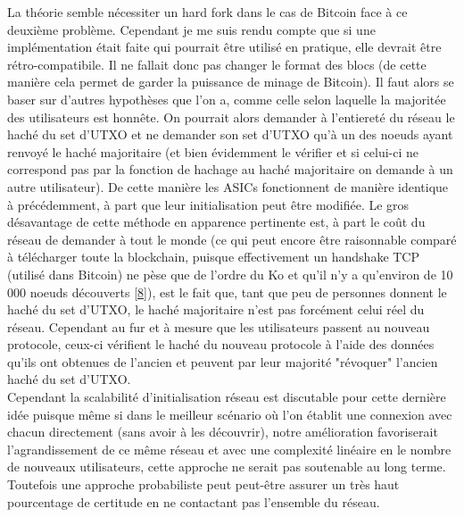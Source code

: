 \documentclass[12pt,a4paper]{article}
\newcommand{\source}[1]{\hyperlink{#1}{[#1]}}
\begin{document}
	La théorie semble nécessiter un hard fork dans le cas de Bitcoin face à ce deuxième problème. Cependant je me suis rendu compte que si une implémentation était faite qui pourrait être utilisé en pratique, elle devrait être rétro-compatibile. Il ne fallait donc pas changer le format des blocs (de cette manière cela permet de garder la puissance de minage de Bitcoin). Il faut alors se baser sur d'autres hypothèses que l'on a, comme celle selon laquelle la majoritée des utilisateurs est honnête. On pourrait alors demander à l'entiereté du réseau le haché du set d'UTXO et ne demander son set d'UTXO qu'à un des noeuds ayant renvoyé le haché majoritaire (et bien évidemment le vérifier et si celui-ci ne correspond pas par la fonction de hachage au haché majoritaire on demande à un autre utilisateur). De cette manière les ASICs fonctionnent de manière identique à précédemment, à part que leur initialisation peut être modifiée. Le gros désavantage de cette méthode en apparence pertinente est, à part le coût du réseau de demander à tout le monde (ce qui peut encore être raisonnable comparé à télécharger toute la blockchain, puisque effectivement un handshake TCP (utilisé dans Bitcoin) ne pèse que de l'ordre du Ko et qu'il n'y a qu'environ de 10 000 noeuds découverts \source{8}), est le fait que, tant que peu de personnes donnent le haché du set d'UTXO, le haché majoritaire n'est pas forcément celui réel du réseau. Cependant au fur et à mesure que les utilisateurs passent au nouveau protocole, ceux-ci vérifient le haché du nouveau protocole à l'aide des données qu'ils ont obtenues de l'ancien et peuvent par leur majorité "révoquer" l'ancien haché du set d'UTXO.\\ %
	Cependant la scalabilité d'initialisation réseau est discutable pour cette dernière idée puisque même si dans le meilleur scénario où l'on établit une connexion avec chacun directement (sans avoir à les découvrir), notre amélioration favoriserait l'agrandissement de ce même réseau et avec une complexité linéaire en le nombre de nouveaux utilisateurs, cette approche ne serait pas soutenable au long terme. Toutefois une approche probabiliste peut peut-être assurer un très haut pourcentage de certitude en ne contactant pas l'ensemble du réseau.\\
\end{document}
